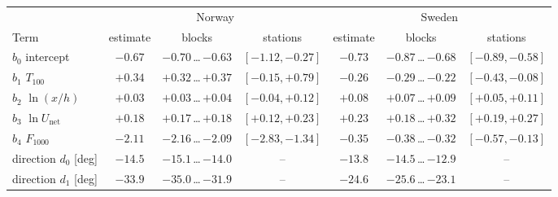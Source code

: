\begin{tabular}{@{}lcccccc@{}}
\toprule
 & \multicolumn{3}{c}{Norway} & \multicolumn{3}{c}{Sweden} \\
Term & estimate & blocks & stations & estimate & blocks & stations \\
\midrule
$b_0$ intercept & $-0.67$ & $-0.70$\,…\,$-0.63$ & $[-1.12, -0.27]$ & $-0.73$ & $-0.87$\,…\,$-0.68$ & $[-0.89, -0.58]$ \\
$b_1$ $T_{100}$ & $+0.34$ & $+0.32$\,…\,$+0.37$ & $[-0.15, +0.79]$ & $-0.26$ & $-0.29$\,…\,$-0.22$ & $[-0.43, -0.08]$ \\
$b_2$ $\ln(x/h)$ & $+0.03$ & $+0.03$\,…\,$+0.04$ & $[-0.04, +0.12]$ & $+0.08$ & $+0.07$\,…\,$+0.09$ & $[+0.05, +0.11]$ \\
$b_3$ $\ln U_\mathrm{net}$ & $+0.18$ & $+0.17$\,…\,$+0.18$ & $[+0.12, +0.23]$ & $+0.23$ & $+0.18$\,…\,$+0.32$ & $[+0.19, +0.27]$ \\
$b_4$ $F_{1000}$ & $-2.11$ & $-2.16$\,…\,$-2.09$ & $[-2.83, -1.34]$ & $-0.35$ & $-0.38$\,…\,$-0.32$ & $[-0.57, -0.13]$ \\
direction $d_0$ [deg] & $-14.5$ & $-15.1$\,…\,$-14.0$ & -- & $-13.8$ & $-14.5$\,…\,$-12.9$ & -- \\
direction $d_1$ [deg] & $-33.9$ & $-35.0$\,…\,$-31.9$ & -- & $-24.6$ & $-25.6$\,…\,$-23.1$ & -- \\
\bottomrule
\end{tabular}
